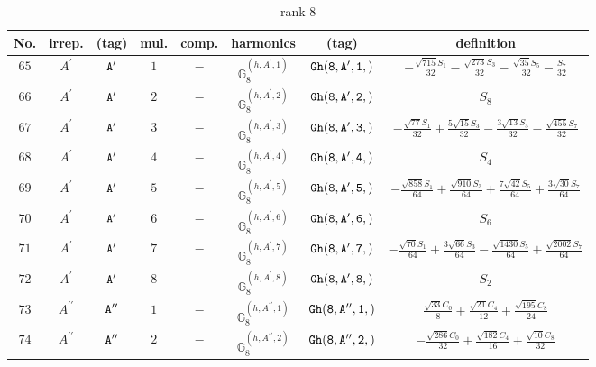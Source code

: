\documentclass[fleqn,8pt]{jsarticle}
\begin{document}
\begin{table}[ht!]
\begin{center}
\caption{rank 8}
\renewcommand{\arraystretch}{1.3}
\begin{tabular}{cccccccc} \hline \hline
No. & irrep. & (tag) & mul. & comp. & harmonics & (tag) & definition \\ \hline
$ 65 $ & $ A^{\prime} $ & $ {\tt A'} $ & $ 1 $ & $ - $ & $ \mathbb{G}_{8}^{(h,A^{\prime},1)} $ & $ {\tt Gh(8,A',1,)} $ & $ - \frac{\sqrt{715} S_{1}}{32} - \frac{\sqrt{273} S_{3}}{32} - \frac{\sqrt{35} S_{5}}{32} - \frac{S_{7}}{32} $ \\
$ 66 $ & $ A^{\prime} $ & $ {\tt A'} $ & $ 2 $ & $ - $ & $ \mathbb{G}_{8}^{(h,A^{\prime},2)} $ & $ {\tt Gh(8,A',2,)} $ & $ S_{8} $ \\
$ 67 $ & $ A^{\prime} $ & $ {\tt A'} $ & $ 3 $ & $ - $ & $ \mathbb{G}_{8}^{(h,A^{\prime},3)} $ & $ {\tt Gh(8,A',3,)} $ & $ - \frac{\sqrt{77} S_{1}}{32} + \frac{5 \sqrt{15} S_{3}}{32} - \frac{3 \sqrt{13} S_{5}}{32} - \frac{\sqrt{455} S_{7}}{32} $ \\
$ 68 $ & $ A^{\prime} $ & $ {\tt A'} $ & $ 4 $ & $ - $ & $ \mathbb{G}_{8}^{(h,A^{\prime},4)} $ & $ {\tt Gh(8,A',4,)} $ & $ S_{4} $ \\
$ 69 $ & $ A^{\prime} $ & $ {\tt A'} $ & $ 5 $ & $ - $ & $ \mathbb{G}_{8}^{(h,A^{\prime},5)} $ & $ {\tt Gh(8,A',5,)} $ & $ - \frac{\sqrt{858} S_{1}}{64} + \frac{\sqrt{910} S_{3}}{64} + \frac{7 \sqrt{42} S_{5}}{64} + \frac{3 \sqrt{30} S_{7}}{64} $ \\
$ 70 $ & $ A^{\prime} $ & $ {\tt A'} $ & $ 6 $ & $ - $ & $ \mathbb{G}_{8}^{(h,A^{\prime},6)} $ & $ {\tt Gh(8,A',6,)} $ & $ S_{6} $ \\
$ 71 $ & $ A^{\prime} $ & $ {\tt A'} $ & $ 7 $ & $ - $ & $ \mathbb{G}_{8}^{(h,A^{\prime},7)} $ & $ {\tt Gh(8,A',7,)} $ & $ - \frac{\sqrt{70} S_{1}}{64} + \frac{3 \sqrt{66} S_{3}}{64} - \frac{\sqrt{1430} S_{5}}{64} + \frac{\sqrt{2002} S_{7}}{64} $ \\
$ 72 $ & $ A^{\prime} $ & $ {\tt A'} $ & $ 8 $ & $ - $ & $ \mathbb{G}_{8}^{(h,A^{\prime},8)} $ & $ {\tt Gh(8,A',8,)} $ & $ S_{2} $ \\
$ 73 $ & $ A^{\prime\prime} $ & $ {\tt A''} $ & $ 1 $ & $ - $ & $ \mathbb{G}_{8}^{(h,A^{\prime\prime},1)} $ & $ {\tt Gh(8,A'',1,)} $ & $ \frac{\sqrt{33} C_{0}}{8} + \frac{\sqrt{21} C_{4}}{12} + \frac{\sqrt{195} C_{8}}{24} $ \\
$ 74 $ & $ A^{\prime\prime} $ & $ {\tt A''} $ & $ 2 $ & $ - $ & $ \mathbb{G}_{8}^{(h,A^{\prime\prime},2)} $ & $ {\tt Gh(8,A'',2,)} $ & $ - \frac{\sqrt{286} C_{0}}{32} + \frac{\sqrt{182} C_{4}}{16} + \frac{\sqrt{10} C_{8}}{32} $ \\

\end{tabular}
\end{center}
\end{table}
\end{document}
